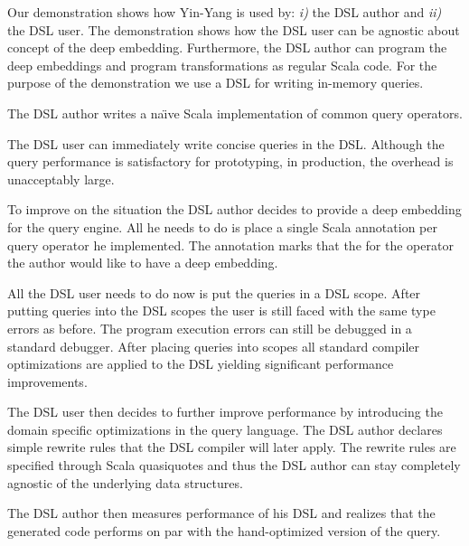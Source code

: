 \documentclass{llncs}
\newcommand{\tool}{Yin-Yang\xspace}
\begin{document}
  Our demonstration shows how \tool is used by: \emph{i)} the DSL author and \emph{ii)} the DSL user. The demonstration shows how the DSL user can be agnostic about concept of the deep embedding. Furthermore, the DSL author can program the deep embeddings and program transformations as regular Scala code. For the purpose of the demonstration we use a DSL for writing in-memory queries.

  The DSL author writes a na\"{\i}ve Scala implementation of common query operators.

  The DSL user can immediately write concise queries in the DSL. Although the query performance is satisfactory for prototyping, in production, the overhead is unacceptably large.

  To improve on the situation the DSL author decides to provide a deep embedding for the query engine. All he needs to do is place a single Scala annotation per query operator he implemented. The annotation marks that the for the operator the author would like to have a deep embedding.

  All the DSL user needs to do now is put the queries in a DSL scope. After putting queries into the DSL scopes the user is still faced with the same type errors as before. The program execution errors can still be debugged in a standard debugger. After placing queries into scopes all standard compiler optimizations are applied to the DSL yielding significant performance improvements.

  The DSL user then decides to further improve performance by introducing the domain specific optimizations in the query language. The DSL author declares simple rewrite rules that the DSL compiler will later apply. The rewrite rules are specified through Scala quasiquotes and thus the DSL author can stay completely agnostic of the underlying data structures.


  The DSL author then measures performance of his DSL and realizes that the generated code performs on par with the hand-optimized version of the query.




\end{document}
